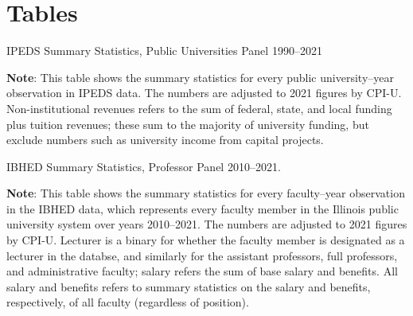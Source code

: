 \newpage
\section{Tables}
\label{sec:tables}

\begin{table}[H]
    \singlespacing
    \caption{IPEDS Summary Statistics, Public Universities Panel 1990--2021}
    \makebox[\textwidth][c]{}
    \label{tab:ipeds-summary}
    \justify
    \footnotesize
    \textbf{Note}:
    This table shows the summary statistics for every public university--year observation in IPEDS data.
    The numbers are adjusted to 2021 figures by CPI-U.
    Non-institutional revenues refers to the sum of federal, state, and local funding plus tuition revenues; these sum to the majority of university funding, but exclude numbers such as university income from capital projects.
\end{table}

\begin{table}[H]
    \singlespacing
    \centering
    \caption{IBHED Summary Statistics, Professor Panel 2010--2021.}
    \makebox[\textwidth][c]{}
    \label{tab:illinois-summary}

    \justify
    \footnotesize
    \textbf{Note}:
    This table shows the summary statistics for every faculty--year observation in the IBHED data, which represents every faculty member in the Illinois public university system over years 2010--2021.
    The numbers are adjusted to 2021 figures by CPI-U.
    Lecturer is a binary for whether the faculty member is designated as a lecturer in the databse, and similarly for the assistant professors, full professors, and administrative faculty;
    salary refers the sum of base salary and benefits.
    All salary and benefits refers to summary statistics on the salary and benefits, respectively, of all faculty (regardless of position).
\end{table}

